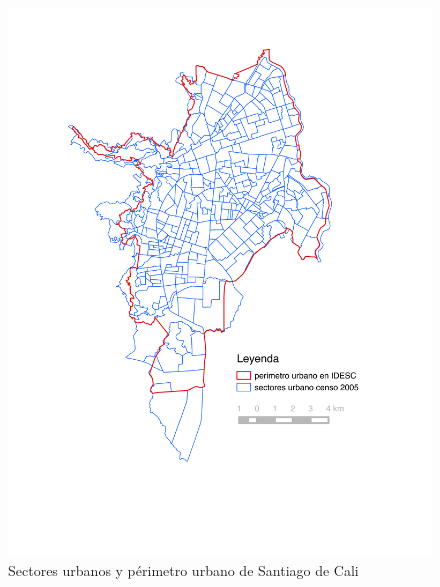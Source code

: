 \documentclass[12pt,a4paper,openany]{book}
\theoremstyle{definition}
\theoremstyle{definition}
\theoremstyle{definition}
\theoremstyle{remark}
\begin{document}
\begin{figure}

{\centering \includegraphics[width=1\linewidth]{images/sectoresurbanos_perimetro_idesc} 

}

\caption{Sectores urbanos y périmetro urbano de Santiago de Cali}\label{fig:su-periurbano}
\end{figure}
\end{document}
